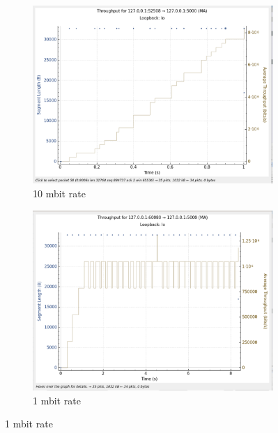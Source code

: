 \documentclass{report}
\begin{document}
\begin{figure}[H]
    \centering
    \begin{subfigure}[b]{0.45\textwidth}
        \centering
        \includegraphics[width=\textwidth]{Pics/Reno/r10mbit_s1m_th}
        \caption{10 mbit rate}
    \end{subfigure}
    \hfill
    \begin{subfigure}[b]{0.45\textwidth}
        \centering
        \includegraphics[width=\textwidth]{Pics/Reno/r1mbit_s1m_th}
        \caption{1 mbit rate}
    \end{subfigure}
    \medskip


\end{figure}
\end{document}
